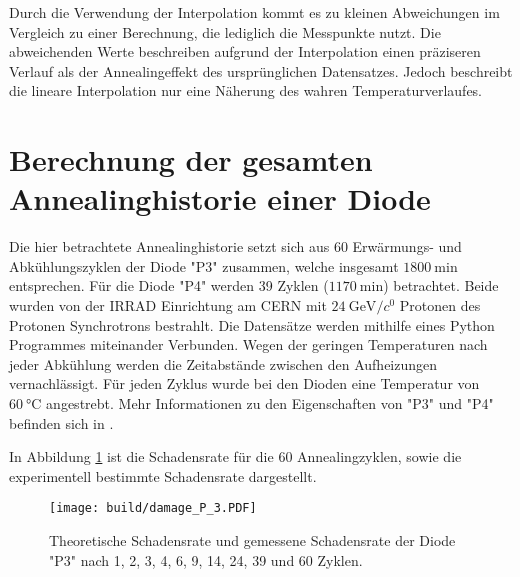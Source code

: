 Durch die Verwendung der Interpolation kommt es zu kleinen Abweichungen im
Vergleich zu einer Berechnung, die lediglich die Messpunkte nutzt.
Die abweichenden Werte beschreiben
aufgrund der Interpolation einen präziseren Verlauf als der Annealingeffekt des ursprünglichen Datensatzes.
Jedoch beschreibt die lineare Interpolation nur eine Näherung des wahren Temperaturverlaufes.

\section{Berechnung der gesamten Annealinghistorie einer Diode}
Die hier betrachtete Annealinghistorie setzt sich aus 60 Erwärmungs- und
Abkühlungszyklen der Diode "P3" zusammen, welche insgesamt $\SI{1800}{\minute}$ entsprechen.
Für die Diode "P4" werden 39 Zyklen ($\SI{1170}{\minute}$) betrachtet.
Beide wurden von der ${\mathrm{IRRAD}}$ Einrichtung \cite{irrad} am CERN mit $\SI{24}{\giga\eV\per\clight}$ Protonen des Protonen Synchrotrons bestrahlt.
Die Datensätze werden mithilfe eines Python Programmes miteinander Verbunden.
Wegen der geringen
Temperaturen nach jeder Abkühlung werden die Zeitabstände zwischen den Aufheizungen vernachlässigt.
Für jeden Zyklus wurde bei den Dioden eine Temperatur von $\SI{60}{\celsius}$ angestrebt.
Mehr Informationen zu den Eigenschaften von "P3" und "P4" befinden sich in  \cite{felix}.


In Abbildung \ref{fig:P_3} ist die Schadensrate für die 60 Annealingzyklen,
sowie die experimentell bestimmte Schadensrate dargestellt.

\begin{figure}
  \centering
    \texttt{[image: build/damage\_P\_3.PDF]}
\caption{Theoretische Schadensrate und gemessene Schadensrate der
Diode "P3" nach 1, 2, 3, 4, 6, 9, 14, 24, 39 und 60 Zyklen.}
\label{fig:P_3}
\end{figure}

